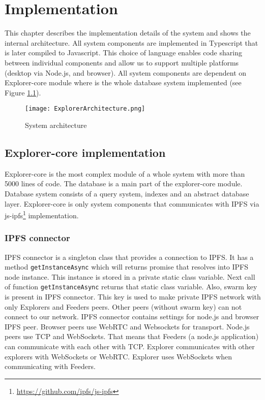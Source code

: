\chapter{Implementation}
\label{Implementation}
This chapter describes the implementation details of the system and shows the internal architecture. All system components are implemented in Typescript that is later compiled to Javascript. This choice of language enables code sharing between individual components and allow us to support multiple platforms (desktop via Node.js, and browser). All system components are dependent on Explorer-core module where is the whole database system implemented (see Figure \ref{systemArchitecture}). 


\begin{figure}[h]
    \centering
    \texttt{[image: ExplorerArchitecture.png]}
    \caption{System architecture}
    \label{systemArchitecture}
\end{figure}


\section{Explorer-core implementation}
Explorer-core is the most complex module of a whole system with more than 5000 lines of code. The database is a main part of the explorer-core module. Database system consists of a query system, indexes and an abstract database layer. Explorer-core is only system components that communicates with IPFS via js-ipfs\footnote{\url{https://github.com/ipfs/js-ipfs}} implementation.

\subsection{IPFS connector}
IPFS connector is a singleton class that provides a connection to IPFS. It has a method \texttt{getInstanceAsync} which will returns promise that resolves into IPFS node instance. This instance is stored in a private static class variable. Next call of function \texttt{getInstanceAsync} returns that static class variable.
Also, swarm key is present in IPFS connector. This key is used to make private IPFS network with only Explorers and Feeders peers. Other peers (without swarm key) can not connect to our network. IPFS connector contains settings for node.js and browser IPFS peer. Browser peers use WebRTC and Websockets for transport. Node.js peers use TCP and WebSockets. That means that Feeders (a node.js application) can communicate with each other with TCP. Explorer communicates with other explorers with WebSockets or WebRTC. Explorer uses WebSockets when communicating with Feeders.

